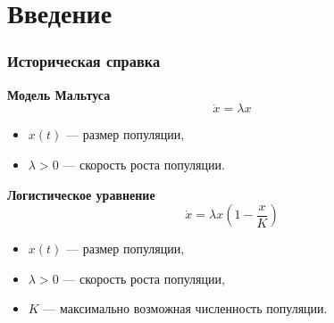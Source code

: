 \begin{frame}
    \setcounter{framenumber}{1}
    \maketitle
\end{frame}

\section{Введение}

\begin{frame}
	\frametitle{Историческая справка}
	
	\textbf{Модель Мальтуса}
	\begin{equation*}
		\dot{x}=\lambda x
	\end{equation*}
	\begin{itemize}
		\item $x(t)$ --- размер популяции,
		\item $\lambda > 0$ --- скорость роста популяции.
	\end{itemize}
	
	\pause
	
	\bigskip
	
	\textbf{Логистическое уравнение}
	\begin{equation*}
		\dot{x}=\lambda x\left(1-\frac{x}{K}\right)
	\end{equation*}
	\begin{itemize}
		\item $x(t)$ --- размер популяции,
		\item $\lambda > 0$ --- скорость роста популяции,
		\item $K$ --- максимально возможная численность популяции.
	\end{itemize}
	
\end{frame}

